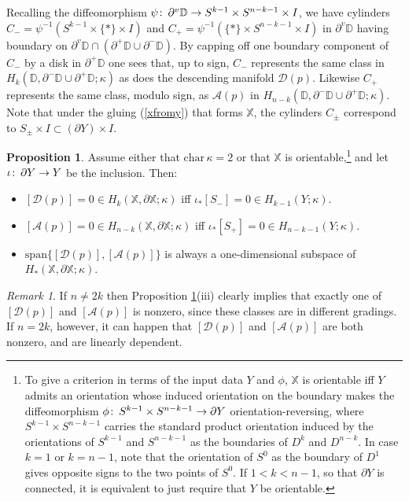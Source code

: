 \documentclass[11pt]{amsart}
\theoremstyle{definition}
\newtheorem{prop}[theorem]{Proposition}
\theoremstyle{remark}
\newtheorem{remark}[theorem]{Remark}
\numberwithin{equation}{section}
\def\co{\colon\thinspace}
\begin{document}
Recalling the diffeomorphism $\psi\co \partial^v\mathbb{D}\to S^{k-1}\times S^{n-k-1}\times I$, we have cylinders $C_-=\psi^{-1}(S^{k-1}\times\{\ast\}\times I)$ and $C_+=\psi^{-1}(\{\ast\}\times S^{n-k-1}\times I)$ in $\partial^v\mathbb{D}$ having boundary on $\partial^v\mathbb{D}\cap(\partial^+\mathbb{D}\cup\partial^-\mathbb{D})$.  By capping off one boundary component of $C_-$ by a disk in $\partial^+\mathbb{D}$ one sees that, up to sign, $C_-$ represents the same class in $H_{k}(\mathbb{D},\partial^-\mathbb{D}\cup \partial^+\mathbb{D};\kappa)$ as does the descending manifold $\mathcal{D}(p)$.  Likewise $C_+$ represents the same class, modulo sign, as $\mathcal{A}(p)$ in $H_{n-k}(\mathbb{D},\partial^-\mathbb{D}\cup\partial^+\mathbb{D};\kappa)$.  Note that under the gluing (\ref{xfromy}) that forms $\mathbb{X}$, the cylinders $C_{\pm}$ correspond to $S_{\pm}\times I\subset (\partial Y)\times I$.

\begin{prop}\label{dacrit} Assume either that $\mathrm{char}\,\kappa=2$ or that $\mathbb{X}$ is orientable,\footnote{To give a criterion in terms of the input data $Y$ and $\phi$, $\mathbb{X}$ is orientable iff $Y$ admits an orientation whose induced orientation on the boundary makes the diffeomorphism $\phi\co S^{k-1}\times S^{n-k-1}\to \partial Y$ orientation-reversing, where $S^{k-1}\times S^{n-k-1}$ carries the standard product orientation induced by the orientations of $S^{k-1}$ and $S^{n-k-1}$ as the boundaries of $D^k$ and $D^{n-k}$.  In case $k=1$ or $k=n-1$, note that the orientation of $S^0$ as the boundary of $D^1$ gives opposite signs to the two points of $S^0$. If $1<k<n-1$, so that $\partial Y$ is connected, it is equivalent to just require that $Y$ be orientable.} and let $\iota\co \partial Y\to Y$ be the inclusion. Then: \begin{itemize} \item[(i)] $[\mathcal{D}(p)]=0\in H_k(\mathbb{X},\partial\mathbb{X};\kappa)$ iff $\iota_*[S_-]=0\in H_{k-1}(Y;\kappa)$.
		\item[(ii)] $[\mathcal{A}(p)]=0\in H_{n-k}(\mathbb{X},\partial\mathbb{X};\kappa)$ iff $\iota_*[S_+]=0\in H_{n-k-1}(Y;\kappa)$.
		\item[(iii)] $\mathrm{span}\{[\mathcal{D}(p)],[\mathcal{A}(p)]\}$ is always a one-dimensional subspace of $H_*(\mathbb{X},\partial\mathbb{X};\kappa)$. \end{itemize}
\end{prop}

\begin{remark}
	If $n\neq 2k$ then Proposition \ref{dacrit}(iii) clearly implies that exactly one of $[\mathcal{D}(p)]$ and $[\mathcal{A}(p)]$ is nonzero, since these classes are in different gradings.  If $n=2k$, however, it can happen that $[\mathcal{D}(p)]$ and $[\mathcal{A}(p)]$ are both nonzero, and are linearly dependent.
\end{remark}
\end{document}
